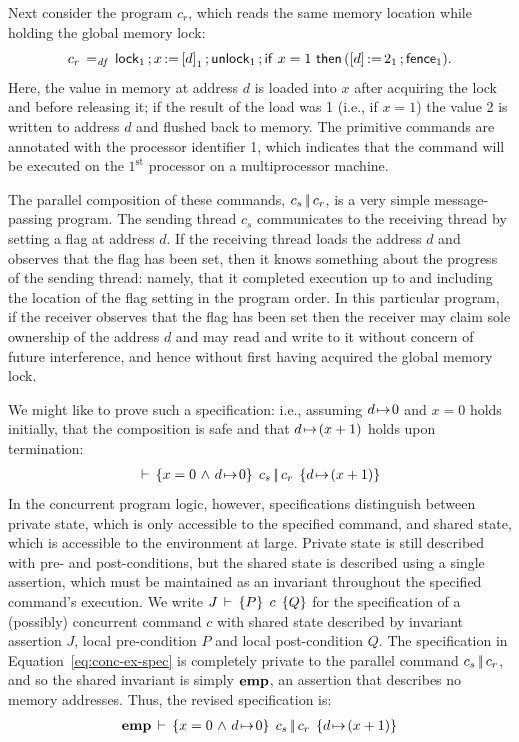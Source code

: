 \documentclass[11pt]{report}         %
\begin{document}
Next consider the program $c_r$, which reads the same memory location while holding the global memory lock: \[ c_r \operatorname{\;=_{\mathit{df}}\;} \operatorname{\mathsf{lock}}_1 \operatorname{;} x \operatorname{:\!=} \left[ d \right]_1 \operatorname{;} \operatorname{\mathsf{unlock}}_1 \operatorname{;} \operatorname{\mathsf{if\,}} x = 1 \operatorname{\mathsf{\,then\,}} (\left[ d \right] \operatorname{:\!=} 2_1 \operatorname{;} \operatorname{\mathsf{fence}}_1).\] Here, the value in memory at address $d$ is loaded into $x$ after acquiring the lock and before releasing it; if the result of the load was 1 (i.e., if $x = 1$) the value 2 is written to address $d$ and flushed back to memory. The primitive commands are annotated with the processor identifier 1, which indicates that the command will be executed on the $1^{\mathrm{st}}$ processor on a multiprocessor machine. 

The parallel composition of these commands, $c_s \operatorname{|\!|} c_r$, is a very simple message-passing program. The sending thread $c_s$ communicates to the receiving thread by setting a flag at address $d$. If the receiving thread loads the address $d$ and observes that the flag has been set, then it knows something about the progress of the sending thread: namely, that it completed execution up to and including the location of the flag setting in the program order. In this particular program, if the receiver observes that the flag has been set then the receiver may claim sole ownership of the address $d$ and may read and write to it without concern of future interference, and hence without first having acquired the global memory lock.

We might like to prove such a specification: i.e., assuming $d \!\mapsto\! 0$ and $x = 0$ holds initially, that the composition is safe and that $d \!\mapsto\! (x+1)$ holds upon termination: \begin{align}
\label{eq:conc-ex-spec} \,\vdash\,\left\lbrace x = 0 \operatorname{\,\wedge\,} d \!\mapsto\! 0 \right\rbrace\;c_s \operatorname{|\!|} c_r\;\left\lbrace d \!\mapsto\! (x+1) \right\rbrace\end{align} In the concurrent program logic, however, specifications distinguish between private state, which is only accessible to the specified command, and shared state, which is accessible to the environment at large. Private state is still described with pre- and post-conditions, but the shared state is described using a single assertion, which must be maintained as an invariant throughout the specified command's execution. We write $J\,\vdash\,\left\lbrace P \right\rbrace\;c\;\left\lbrace Q \right\rbrace$ for the specification of a (possibly) concurrent command $c$ with shared state described by invariant assertion $J$, local pre-condition $P$ and local post-condition $Q$. The specification in Equation~\ref{eq:conc-ex-spec} is completely private to the parallel command $c_s \operatorname{|\!|} c_r$, and so the shared invariant is simply $\mathbf{emp}$, an assertion that describes no memory addresses. Thus, the revised specification is: \begin{align}\label{eq:conc-ex-spec-rev} \mathbf{emp}\,\vdash\,\left\lbrace x = 0 \operatorname{\,\wedge\,} d \!\mapsto\! 0 \right\rbrace\;c_s \operatorname{|\!|} c_r\;\left\lbrace d \!\mapsto\! (x+1) \right\rbrace\end{align}
\end{document}
